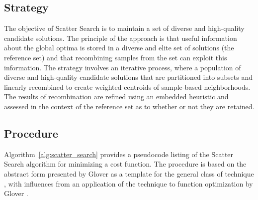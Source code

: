\subsection{Strategy}
The objective of Scatter Search is to maintain a set of diverse and high-quality candidate solutions. The principle of the approach is that useful information about the global optima is stored in a diverse and elite set of solutions (the reference set) and that recombining samples from the set can exploit this information.
The strategy involves an iterative process, where a population of diverse and high-quality candidate solutions that are partitioned into subsets and linearly recombined to create weighted centroids of sample-based neighborhoods. The results of recombination are refined using an embedded heuristic and assessed in the context of the reference set as to whether or not they are retained.

\subsection{Procedure}
Algorithm~\ref{alg:scatter_search} provides a pseudocode listing of the Scatter Search algorithm for minimizing a cost function. The procedure is based on the abstract form presented by Glover as a template for the general class of technique \cite{Glover1998a}, with influences from an application of the technique to function optimization by Glover \cite{Glover1998a}.

